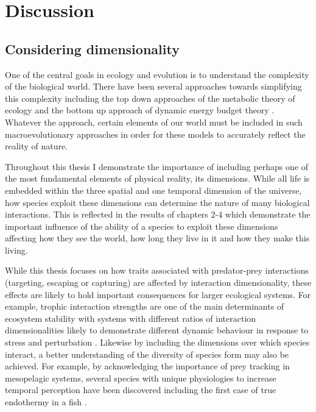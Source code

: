 \chapter{Discussion}
\label{chap:discussion}


\section{Considering dimensionality}

One of the central goals in ecology and evolution is to understand the complexity of the biological world. There have been several approaches towards simplifying this complexity including the top down approaches of the metabolic theory of ecology \citep{brown2004} and the bottom up approach of dynamic energy budget theory \citep{kooijman2009dynamic}. Whatever the approach, certain elements of our world must be included in such macroevolutionary approaches in order for these models to accurately reflect the reality of nature. 


Throughout this thesis I demonstrate the importance of including perhaps one of the most fundamental elements of physical reality, its dimensions. While all life is embedded within the three spatial and one temporal dimension of the universe, how species exploit these dimensions can determine the nature of many biological interactions. This is reflected in the results of chapters 2-4 which demonstrate the important influence of the ability of a species to exploit these dimensions affecting how they see the world, how long they live in it and how they make this living. 


While this thesis focuses on how traits associated with predator-prey interactions (targeting, escaping or capturing) are affected by interaction dimensionality, these effects are likely to hold important consequences for larger ecological systems. For example, trophic interaction strengths are one of the main determinants of ecosystem stability \citep{may1972will,pimm1984complexity} with systems with different ratios of interaction dimensionalities likely to demonstrate different dynamic behaviour in response to stress and perturbation \citep{donohue2013dimensionality}. Likewise by including the dimensions over which species interact, a better understanding of the diversity of species form may also be achieved. For example, by acknowledging the importance of prey tracking in mesopelagic systems, several species with unique physiologies to increase temporal perception have been discovered \citep{fritsches2005warm,frank2012light,landgren2014visual} including the first case of true endothermy in a fish \citep{Wegner15052015}.


